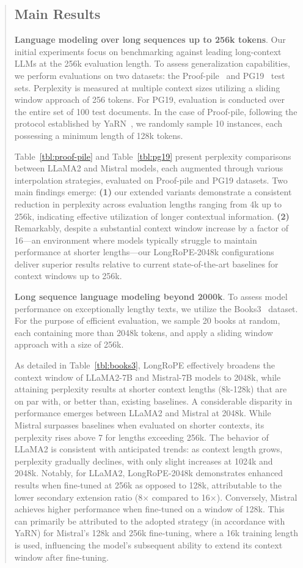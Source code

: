 \begin{abstract}
\subsection{Main Results}

\label{sec:mainresult}
\textbf{Language modeling over long sequences up to 256k tokens}. Our initial experiments focus on benchmarking against leading long-context LLMs at the 256k evaluation length. To assess generalization capabilities, we perform evaluations on two datasets: the Proof-pile~\cite{pg19} and PG19~\cite{pile} test sets. Perplexity is measured at multiple context sizes utilizing a sliding window approach of 256 tokens. For PG19, evaluation is conducted over the entire set of 100 test documents. In the case of Proof-pile, following the protocol established by YaRN~\cite{yarn}, we randomly sample 10 instances, each possessing a minimum length of 128k tokens.

Table~\ref{tbl:proof-pile} and Table~\ref{tbl:pg19} present perplexity comparisons between LLaMA2 and Mistral models, each augmented through various interpolation strategies, evaluated on Proof-pile and PG19 datasets. Two main findings emerge: \textbf{(1)} our extended variants demonstrate a consistent reduction in perplexity across evaluation lengths ranging from 4k up to 256k, indicating effective utilization of longer contextual information. \textbf{(2)} Remarkably, despite a substantial context window increase by a factor of 16—an environment where models typically struggle to maintain performance at shorter lengths—our LongRoPE-2048k configurations deliver superior results relative to current state-of-the-art baselines for context windows up to 256k.

\textbf{Long sequence language modeling beyond 2000k}. To assess model performance on exceptionally lengthy texts, we utilize the Books3~\cite{pile} dataset. For the purpose of efficient evaluation, we sample 20 books at random, each containing more than 2048k tokens, and apply a sliding window approach with a size of 256k.

As detailed in Table~\ref{tbl:books3}, LongRoPE effectively broadens the context window of LLaMA2-7B and Mistral-7B models to 2048k, while attaining perplexity results at shorter context lengths (8k-128k) that are on par with, or better than, existing baselines. A considerable disparity in performance emerges between LLaMA2 and Mistral at 2048k. While Mistral surpasses baselines when evaluated on shorter contexts, its perplexity rises above 7 for lengths exceeding 256k. The behavior of LLaMA2 is consistent with anticipated trends: as context length grows, perplexity gradually declines, with only slight increases at 1024k and 2048k. Notably, for LLaMA2, LongRoPE-2048k demonstrates enhanced results when fine-tuned at 256k as opposed to 128k, attributable to the lower secondary extension ratio (8$\times$ compared to 16$\times$). Conversely, Mistral achieves higher performance when fine-tuned on a window of 128k. This can primarily be attributed to the adopted strategy (in accordance with YaRN) for Mistral's 128k and 256k fine-tuning, where a 16k training length is used, influencing the model's subsequent ability to extend its context window after fine-tuning.


\end{abstract}
